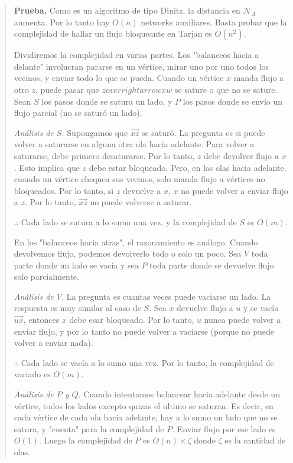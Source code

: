 \documentclass[a4paper]{article}
\begin{document}
\small
\begin{quote}

\textbf{Prueba.} Como es un algoritmo de tipo Dinitz, la distancia en
$\mathcal{N}_A$ aumenta. Por lo tanto hay $O(n)$ networks auxiliares. Basta
probar que la complejidad de hallar un flujo bloqueante en Tarjan es $O(n^2)$.

Dividiremos la complejidad en varias partes. Los "balanceos hacia a delante"
involucran pararse en un vértice, mirar uno por uno todos los vecinos, y enviar
todo lo que se pueda. Cuando un vértice $x$ manda flujo a otro $z$, puede pasar
que $zoverrightarrow{xw}$ se sature o que no se sature. Sean $S$  los pasos
donde se satura un lado, y $P$ los pasos donde se envio un flujo parcial (no se
saturó un lado).

\textit{Análisis de $S$.} Supongamos que $\overrightarrow{xz}$ se saturó. La pregunta es si puede volver
a saturarse en alguna otra ola hacia adelante. Para volver a saturarse, debe
primero desaturarse. Por lo tanto, $z$ debe devolver flujo a $x$. Esto implica
que $z$ debe estar bloqueado. Pero, en las olas hacia adelante, cuando un vértice
chequea sus vecinos, solo manda flujo a vértices no bloqueados. Por lo tanto, si 
$z$ devuelve a $x$, $x$ no puede volver a enviar flujo a $z$. Por lo tanto,
$\overrightarrow{xz}$ no puede volverse a saturar. 

$\therefore $ Cada lado se satura a lo sumo una vez, y la complejidad de $S$ es
$O(m)$.

En los "balanceos hacia atras", el razonamiento es análogo. Cuando devolvemos
flujo, podemos devolverlo todo o solo un poco. Sea $V$ toda parte donde un lado
se vacía y sea $P$ toda parte donde se devuelve flujo solo parcialmente. 

\textit{Análisis de $V$}. La pregunta es cuantas veces puede vaciarse un lado.
La respuesta es muy similar al caso de $S$. Sea $x$ devuelve flujo a $u$ y se
vacía $\overrightarrow{ux}$, entonces $x$ debe esar bloqueado. Por lo tanto, 
$u$ nunca puede volver a enviar flujo, y por lo tanto no puede volver a 
vaciarse (porque no puede volver a enviar nada). 

$\therefore $ Cada lado se vacía a lo sumo una vez. Por lo tanto, la
complejidad de vaciado es $O(m)$.

\textit{Análisis de $P$ y $Q$}. Cuando intentamos balancear hacia adelante desde 
un vértice, todos los lados excepto quizas el ultimo se saturan. Es decir, 
en cada vértice de cada ola hacia adelante, hay a lo sumo un lado 
que no se satura, y "cuenta" para la complejidad de $P$. Enviar flujo por ese
lado es $O(1)$. Luego la complejidad de $P$ es $O(n) \times \zeta$ donde
$\zeta$ es la cantidad de olas. 


\end{quote}
\end{document}
